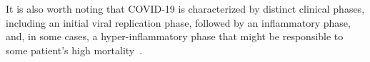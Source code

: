 



It is also worth noting that COVID-19 is characterized by distinct clinical phases, including an initial viral replication phase, followed by an inflammatory phase, and, in some cases, a hyper-inflammatory phase  that might be responsible to some patient's high mortality~\cite{mehta2020covid}.

